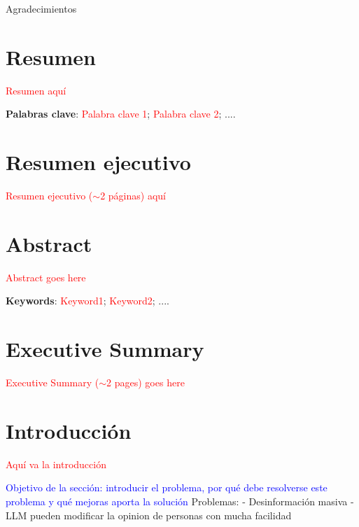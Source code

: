 \documentclass[12pt]{extarticle}
\numberwithin{equation}{section}
\begin{document}
\newpage

{\fontsize{17}{20}
    \begin{center}
        {\large Agradecimientos}
        
    \end{center}
}

\newpage


\section*{Resumen}
\textcolor{red}{Resumen aqu\'i}

\textbf{Palabras clave}: \textcolor{red}{Palabra clave 1}; \textcolor{red}{Palabra clave 2}; .... 

\section*{Resumen ejecutivo}
\textcolor{red}{Resumen ejecutivo ($\sim$2 p\'aginas) aqu\'i}

\newpage
\section*{Abstract}
\textcolor{red}{Abstract goes here}

\textbf{Keywords}: \textcolor{red}{Keyword1}; \textcolor{red}{Keyword2}; .... 

\section*{Executive Summary}
\textcolor{red}{Executive Summary ($\sim$2 pages) goes here}

\newpage
\tableofcontents
\thispagestyle{fancy}
\newpage
\setcounter{page}{1}
\fancyfoot[C]{
    \begin{center}
        \thepage
    \end{center}
} 
\renewcommand{\footrulewidth}{0.4pt}
\setlength{\footskip}{0.8cm}
\section{Introducci\'on}
\textcolor{red}{Aqu\'i va la introducci\'on}

\textcolor{blue}
{Objetivo de la secci\'on: introducir el problema, por qu\'e debe resolverse este problema y qu\'e mejoras aporta la soluci\'on}
{Problemas:
- Desinformación masiva
- LLM pueden modificar la opinion de personas con mucha facilidad}
\end{document}
